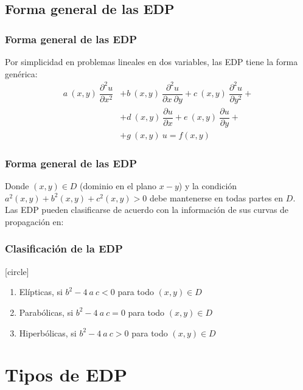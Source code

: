 \subsection{Forma general de las EDP}
\begin{frame}
\frametitle{Forma general de las EDP}
Por simplicidad en problemas lineales en dos variables, las EDP tiene la forma genérica:
\[ \begin{split}  a \: (x,y) \: \dfrac{\partial^{2} u}{\partial x^{2}} &+ b \: (x,y) \: \dfrac{\partial^{2} u}{\partial x \: \partial y} + c \: (x,y) \: \dfrac{\partial^{2} u}{\partial y^{2}} + \\
&+ d \: (x,y) \: \dfrac{\partial u}{\partial x} + e \: (x,y) \: \dfrac{\partial u}{\partial y} + \\
&+ g \: (x,y) \: u = f(x,y) \end{split} \]
\end{frame}
\begin{frame}
\frametitle{Forma general de las EDP}
Donde $(x, y) \in D$ (dominio en el plano $x-y$) y la condición $a^{2} (x, y) + b^{2} (x, y) + c^{2} (x, y)> 0$ debe mantenerse en todas partes en $D$.
\\
\bigskip
Las EDP pueden clasificarse de acuerdo con la información de sus curvas de propagación en:
\end{frame}
\begin{frame}
\frametitle{Clasificación de la EDP}
[circle]
\begin{enumerate}[<+->]
\item Elípticas, si $b^{2} - 4 \: a\: c < 0$ para todo $(x,y) \in D$
\item Parabólicas, si $b^{2} - 4 \: a \: c = 0$ para todo $(x,y) \in D$
\item Hiperbólicas, si $b^{2} - 4 \: a \: c > 0$ para todo $(x,y) \in D$
\end{enumerate}
\end{frame}
\section{Tipos de EDP}
